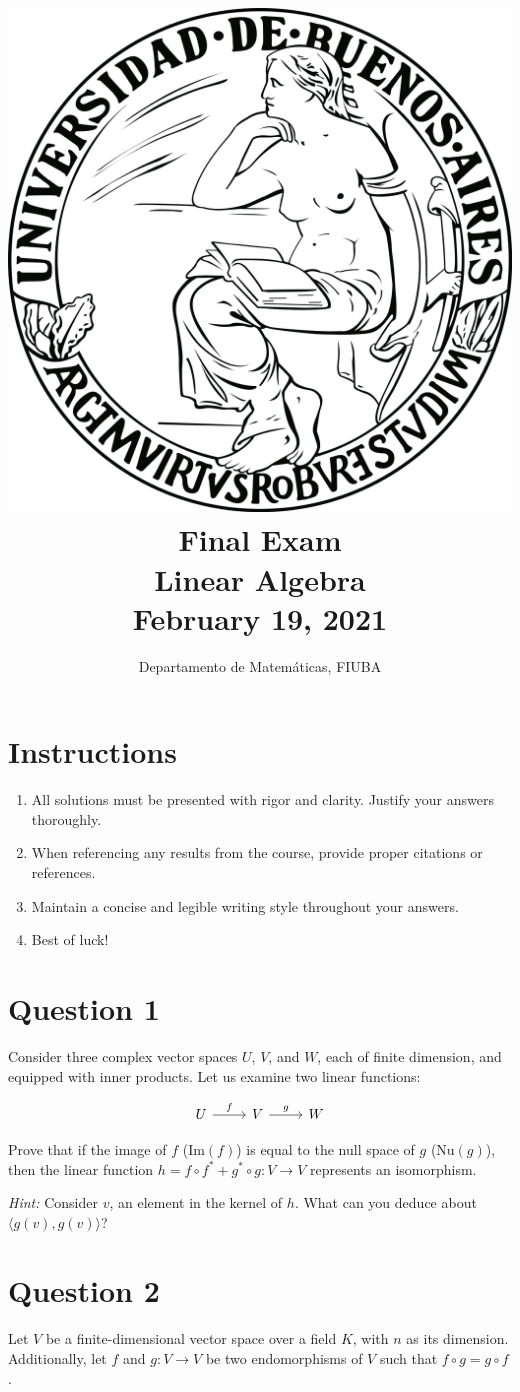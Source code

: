 \documentclass[12pt]{article}
\title{\includegraphics[scale=0.1]{logo.png}\\[0.5cm]\textbf{\Huge Final Exam}\\ \Large Linear Algebra\\ \Large February 19, 2021}
\author{\Large Departamento de Matemáticas, FIUBA}
\date{}
\begin{document}
	
	\maketitle
	\thispagestyle{empty}
	
	\section{Instructions}\label{sec:instructions}
	\begin{enumerate}
		\item All solutions must be presented with rigor and clarity. Justify your answers thoroughly.
		\item When referencing any results from the course, provide proper citations or references.
		\item Maintain a concise and legible writing style throughout your answers.
		\item Best of luck!
	\end{enumerate}
	
	\vspace{-0.5cm}
	
	\section{Question 1}\label{sec:q1}
	Consider three complex vector spaces \(U\), \(V\), and \(W\), each of finite dimension, and equipped with inner products. Let us examine two linear functions:
	
	\[
	\begin{tikzcd}
		U \arrow[r, "f"] & V \arrow[r, "g"] & W
	\end{tikzcd}
	\]
	
	Prove that if the image of \(f\) (\(\text{Im}(f)\)) is equal to the null space of \(g\) (\(\text{Nu}(g)\)), then the linear function \(h = f \circ f^* + g^* \circ g: V \rightarrow V\) represents an isomorphism.
	
	\textit{Hint:} Consider \(v\), an element in the kernel of \(h\). What can you deduce about \(\langle g(v), g(v) \rangle\)?
	
	\vspace{1cm}
	
	\section{Question 2}\label{sec:q2}
	Let \(V\) be a finite-dimensional vector space over a field \(K\), with \(n\) as its dimension. Additionally, let \(f\) and \(g: V \rightarrow V\) be two endomorphisms of \(V\) such that \(f \circ g = g \circ f\).
	
\end{document}
